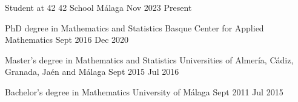 
		\nopagebreak	
		\begin{education} 
			{Student at 42}
			{42 School Málaga}
			{Nov 2023}
			{Present}
		\end{education}
		
		\begin{education} 
			{PhD degree in Mathematics and Statistics}
			{Basque Center for Applied Mathematics}
			{Sept 2016}
			{Dec 2020}
		\end{education}

		\begin{education} 
			{Master's degree in Mathematics and Statistics}
			{Universities of Almer\'ia, C\'adiz, Granada, Ja\'en and M\'alaga}
			{Sept 2015}
			{Jul 2016}
		\end{education}

		\begin{firsteducation} 
			{Bachelor's degree in Mathematics}
			{University of M\'alaga}
			{Sept 2011}
			{Jul 2015}
		\end{firsteducation}
